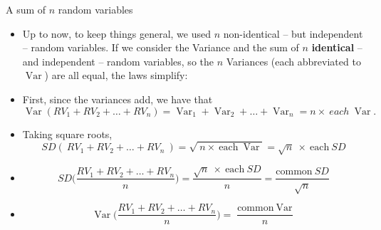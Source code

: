 \documentclass[10pt,handout]{beamer}\usepackage[]{graphicx}\usepackage[]{color}
\newcommand{\Var}{\operatorname{Var}}
\begin{document}
\begin{frame}[fragile]{A sum of $n$ random variables}
	
	\begin{itemize}
		\setlength{\itemsep}{10pt}		
		\item Up to now, to keep things general, we used $n$ non-identical -- but independent -- random variables. If we
		consider the Variance and the sum of $n$ \textbf{identical} -- and independent -- random variables, so the $n$ Variances (each abbreviated to $\Var$) are all equal, the laws simplify:
		
		\item First, since the variances add, we have that	
		$$ \Var(RV_1 + RV_2 + \dots + RV_n) = \Var_1 + \Var_2 + \dots + \Var_n = n \times \ each \ \Var.$$
		
		\item Taking square roots,	
		$$ SD( \ RV_1 + RV_2 + \dots + RV_n \ ) = \sqrt{ \ n \times \ \textrm{each} \ \Var} = \sqrt{n} \ \times \ \textrm{each} \ SD$$
		
		
		\item $$ SD\bigg(\frac{RV_1 + RV_2 + \dots + RV_n}{n}\bigg) = \frac{\sqrt{n} \ \times \ \textrm{each} \ SD}{n} = \frac{\textrm{common} \ SD}{\sqrt{n}} $$
		
		\item $$ \Var\bigg(\frac{RV_1 + RV_2 + \dots + RV_n}{n}\bigg) = \frac{\textrm{common} \ \Var}{n} $$
		
		
		
	\end{itemize}
	
\end{frame}
\end{document}
